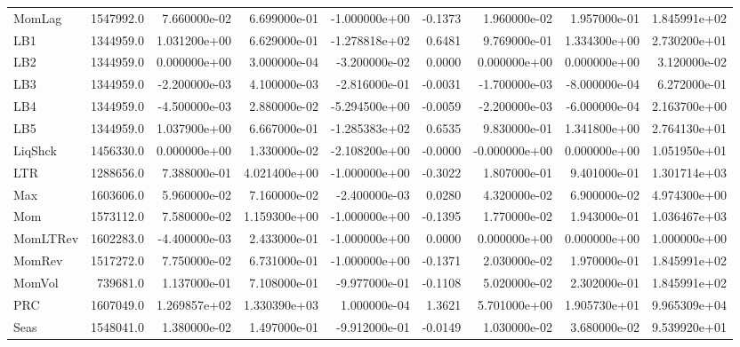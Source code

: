 \begin{tabular}{lrrrrrrrr}
MomLag     &  1547992.0 &  7.660000e-02 &  6.699000e-01 & -1.000000e+00 &      -0.1373 &  1.960000e-02 &  1.957000e-01 &  1.845991e+02 \\
LB1        &  1344959.0 &  1.031200e+00 &  6.629000e-01 & -1.278818e+02 &       0.6481 &  9.769000e-01 &  1.334300e+00 &  2.730200e+01 \\
LB2        &  1344959.0 &  0.000000e+00 &  3.000000e-04 & -3.200000e-02 &       0.0000 &  0.000000e+00 &  0.000000e+00 &  3.120000e-02 \\
LB3        &  1344959.0 & -2.200000e-03 &  4.100000e-03 & -2.816000e-01 &      -0.0031 & -1.700000e-03 & -8.000000e-04 &  6.272000e-01 \\
LB4        &  1344959.0 & -4.500000e-03 &  2.880000e-02 & -5.294500e+00 &      -0.0059 & -2.200000e-03 & -6.000000e-04 &  2.163700e+00 \\
LB5        &  1344959.0 &  1.037900e+00 &  6.667000e-01 & -1.285383e+02 &       0.6535 &  9.830000e-01 &  1.341800e+00 &  2.764130e+01 \\
LiqShck    &  1456330.0 &  0.000000e+00 &  1.330000e-02 & -2.108200e+00 &      -0.0000 & -0.000000e+00 &  0.000000e+00 &  1.051950e+01 \\
LTR        &  1288656.0 &  7.388000e-01 &  4.021400e+00 & -1.000000e+00 &      -0.3022 &  1.807000e-01 &  9.401000e-01 &  1.301714e+03 \\
Max        &  1603606.0 &  5.960000e-02 &  7.160000e-02 & -2.400000e-03 &       0.0280 &  4.320000e-02 &  6.900000e-02 &  4.974300e+00 \\
Mom        &  1573112.0 &  7.580000e-02 &  1.159300e+00 & -1.000000e+00 &      -0.1395 &  1.770000e-02 &  1.943000e-01 &  1.036467e+03 \\
MomLTRev   &  1602283.0 & -4.400000e-03 &  2.433000e-01 & -1.000000e+00 &       0.0000 &  0.000000e+00 &  0.000000e+00 &  1.000000e+00 \\
MomRev     &  1517272.0 &  7.750000e-02 &  6.731000e-01 & -1.000000e+00 &      -0.1371 &  2.030000e-02 &  1.970000e-01 &  1.845991e+02 \\
MomVol     &   739681.0 &  1.137000e-01 &  7.108000e-01 & -9.977000e-01 &      -0.1108 &  5.020000e-02 &  2.302000e-01 &  1.845991e+02 \\
PRC        &  1607049.0 &  1.269857e+02 &  1.330390e+03 &  1.000000e-04 &       1.3621 &  5.701000e+00 &  1.905730e+01 &  9.965309e+04 \\
Seas       &  1548041.0 &  1.380000e-02 &  1.497000e-01 & -9.912000e-01 &      -0.0149 &  1.030000e-02 &  3.680000e-02 &  9.539920e+01 \\

\end{tabular}

